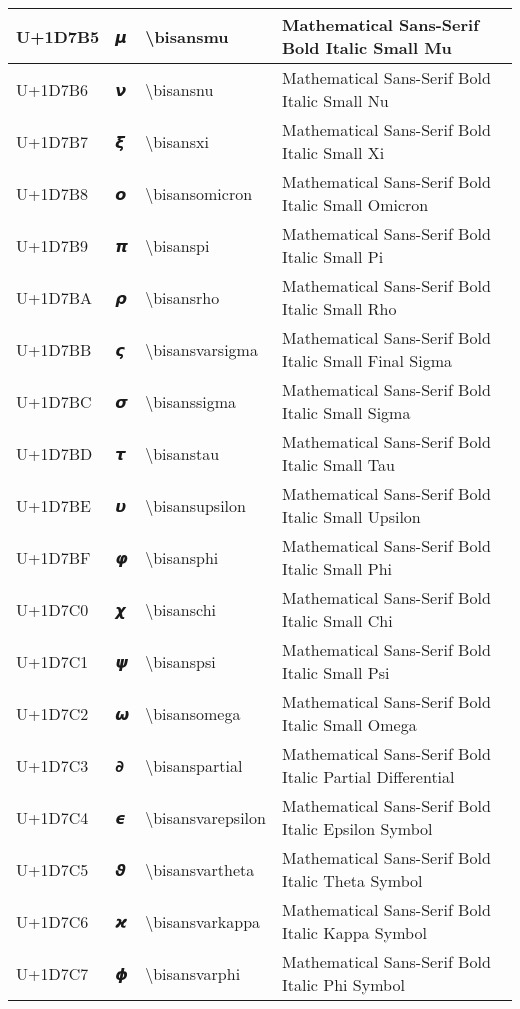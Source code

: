 \begin{table}[h]
\begin{tabulary}{\linewidth}{|L|L|L|L|}
\hline
U+1D7B5 & 𝞵 & {\textbackslash}bisansmu & Mathematical Sans-Serif Bold Italic Small Mu \\
\hline
U+1D7B6 & 𝞶 & {\textbackslash}bisansnu & Mathematical Sans-Serif Bold Italic Small Nu \\
\hline
U+1D7B7 & 𝞷 & {\textbackslash}bisansxi & Mathematical Sans-Serif Bold Italic Small Xi \\
\hline
U+1D7B8 & 𝞸 & {\textbackslash}bisansomicron & Mathematical Sans-Serif Bold Italic Small Omicron \\
\hline
U+1D7B9 & 𝞹 & {\textbackslash}bisanspi & Mathematical Sans-Serif Bold Italic Small Pi \\
\hline
U+1D7BA & 𝞺 & {\textbackslash}bisansrho & Mathematical Sans-Serif Bold Italic Small Rho \\
\hline
U+1D7BB & 𝞻 & {\textbackslash}bisansvarsigma & Mathematical Sans-Serif Bold Italic Small Final Sigma \\
\hline
U+1D7BC & 𝞼 & {\textbackslash}bisanssigma & Mathematical Sans-Serif Bold Italic Small Sigma \\
\hline
U+1D7BD & 𝞽 & {\textbackslash}bisanstau & Mathematical Sans-Serif Bold Italic Small Tau \\
\hline
U+1D7BE & 𝞾 & {\textbackslash}bisansupsilon & Mathematical Sans-Serif Bold Italic Small Upsilon \\
\hline
U+1D7BF & 𝞿 & {\textbackslash}bisansphi & Mathematical Sans-Serif Bold Italic Small Phi \\
\hline
U+1D7C0 & 𝟀 & {\textbackslash}bisanschi & Mathematical Sans-Serif Bold Italic Small Chi \\
\hline
U+1D7C1 & 𝟁 & {\textbackslash}bisanspsi & Mathematical Sans-Serif Bold Italic Small Psi \\
\hline
U+1D7C2 & 𝟂 & {\textbackslash}bisansomega & Mathematical Sans-Serif Bold Italic Small Omega \\
\hline
U+1D7C3 & 𝟃 & {\textbackslash}bisanspartial & Mathematical Sans-Serif Bold Italic Partial Differential \\
\hline
U+1D7C4 & 𝟄 & {\textbackslash}bisansvarepsilon & Mathematical Sans-Serif Bold Italic Epsilon Symbol \\
\hline
U+1D7C5 & 𝟅 & {\textbackslash}bisansvartheta & Mathematical Sans-Serif Bold Italic Theta Symbol \\
\hline
U+1D7C6 & 𝟆 & {\textbackslash}bisansvarkappa & Mathematical Sans-Serif Bold Italic Kappa Symbol \\
\hline
U+1D7C7 & 𝟇 & {\textbackslash}bisansvarphi & Mathematical Sans-Serif Bold Italic Phi Symbol \\

\end{tabulary}
\end{table}

